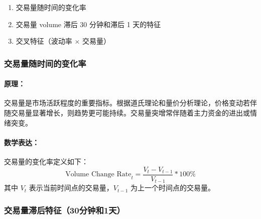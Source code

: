 \documentclass[a4paper,11pt]{ctexart}
\begin{document}
\begin{enumerate}
  \item 交易量随时间的变化率
  \item 交易量 volume 滞后 30 分钟和滞后 1 天的特征
  \item 交叉特征（波动率 $\times$ 交易量）
\end{enumerate}

\subsubsection{交易量随时间的变化率}

\paragraph{原理：}

交易量是市场活跃程度的重要指标。根据道氏理论和量价分析理论，价格变动若伴随交易量显著增长，则趋势更可能持续。交易量突增常伴随着主力资金的进出或情绪突变。

\paragraph{数学表达：}

交易量的变化率定义如下：
\[
\text{Volume Change Rate}_t = \frac{V_t - V_{t-1}}{V_{t-1}}*100\%
\]
其中 $V_t$ 表示当前时间点的交易量，$V_{t-1}$ 为上一个时间点的交易量。









\subsubsection{交易量滞后特征（30分钟和1天）}
\end{document}
